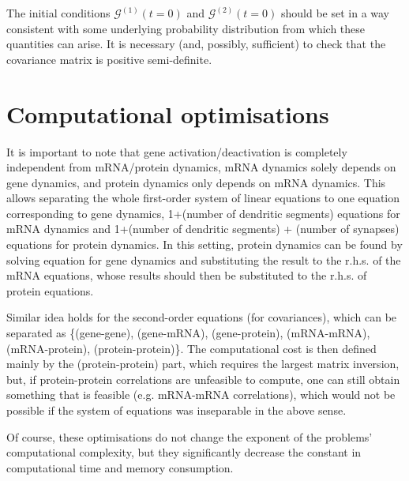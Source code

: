 \documentclass[a4paper, 11pt]{article}
\begin{document}
The initial conditions $\boldsymbol{\mathcal G}^{(1)}(t=0)$ and $\boldsymbol{\mathcal G}^{(2)}(t=0)$ should be set in a way consistent with some underlying probability distribution from which these quantities can arise. It is necessary (and, possibly, sufficient) to check that the covariance matrix is positive semi-definite. 

\appendix \label{app:Computational_optimisations}
\section{Computational optimisations}
It is important to note that gene activation/deactivation is completely independent from mRNA/protein dynamics, mRNA dynamics solely depends on gene dynamics, and protein dynamics only depends on mRNA dynamics. This allows separating the whole first-order system of linear equations to one equation corresponding to gene dynamics, 1+(number of dendritic segments) equations for mRNA dynamics and 1+(number of dendritic segments) + (number of synapses) equations for protein dynamics. In this setting, protein dynamics can be found by solving equation for gene dynamics and substituting the result to the r.h.s. of the mRNA equations, whose results should then be substituted to the r.h.s. of protein equations.

Similar idea holds for the second-order equations (for covariances), which can be separated as \{(gene-gene), (gene-mRNA), (gene-protein), (mRNA-mRNA), (mRNA-protein), (protein-protein)\}. The computational cost is then defined mainly by the (protein-protein) part, which requires the largest matrix inversion, but, if protein-protein correlations are unfeasible to compute, one can still obtain something that is feasible (e.g. mRNA-mRNA correlations), which would not be possible if the system of equations was inseparable in the above sense.

Of course, these optimisations do not change the exponent of the problems' computational complexity, but they significantly decrease the constant in computational time and memory consumption.

\appendix \label{app:DDM_correspondence}
\end{document}
